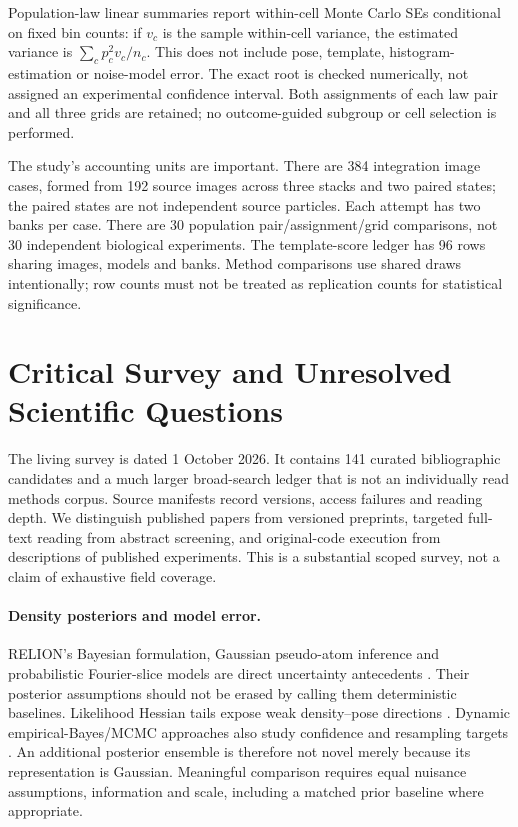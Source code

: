 Population-law linear summaries report within-cell Monte Carlo SEs
conditional on fixed bin counts: if $v_c$ is the sample within-cell
variance, the estimated variance is $\sum_cp_c^2v_c/n_c$.
This does not include pose, template, histogram-estimation or noise-model
error. The exact root is checked numerically, not assigned an experimental
confidence interval. Both assignments of each law pair and all three grids
are retained; no outcome-guided subgroup or cell selection is performed.

The study's accounting units are important. There are 384 integration image
cases, formed from 192 source images across three stacks and two paired
states; the paired states are not independent source particles. Each attempt
has two banks per case. There are 30 population pair/assignment/grid
comparisons, not 30 independent biological experiments. The template-score
ledger has 96 rows sharing images, models and banks. Method comparisons use
shared draws intentionally; row counts must not be treated as replication
counts for statistical significance.

\section{Critical Survey and Unresolved Scientific Questions}
\label{app:survey-new}
The living survey is dated 1 October 2026. It contains 141 curated
bibliographic candidates and a much larger broad-search ledger that is not
an individually read methods corpus. Source manifests record versions,
access failures and reading depth. We distinguish published papers from
versioned preprints, targeted full-text reading from abstract screening,
and original-code execution from descriptions of published experiments.
This is a substantial scoped survey, not a claim of exhaustive field coverage.

\paragraph{Density posteriors and model error.}
RELION's Bayesian formulation, Gaussian pseudo-atom inference and
probabilistic Fourier-slice models are direct uncertainty antecedents
\citep{scheres2012,joubert2015,ullrich2020}. Their posterior assumptions
should not be erased by calling them deterministic baselines. Likelihood
Hessian tails expose weak density--pose directions \citep{rangan2024}.
Dynamic empirical-Bayes/MCMC approaches also study confidence and resampling
targets \citep{lai2023}. An additional posterior ensemble is therefore not
novel merely because its representation is Gaussian. Meaningful comparison
requires equal nuisance assumptions, information and scale, including a
matched prior baseline where appropriate.

